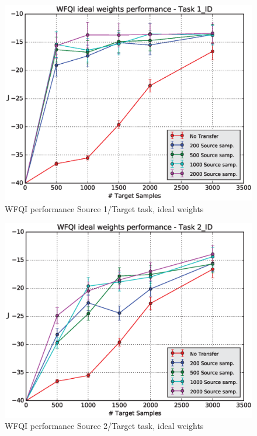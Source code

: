     \begin{figure}[H]
      \centering
      \includegraphics[scale=0.5]{images/WFQIPerf1_ID.eps}
      \caption{WFQI performance Source 1/Target task, ideal weights}
      \label{perf1ID}
    \end{figure}
    \begin{figure}[H]
      \centering
      \includegraphics[scale=0.5]{images/WFQIPerf2_ID.eps}
      \caption{WFQI performance Source 2/Target task, ideal weights}
      \label{perf2ID}
    \end{figure}
